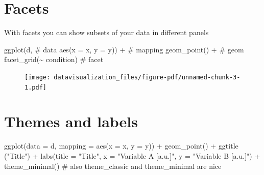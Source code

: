 \documentclass[
  letterpaper,
  DIV=11,
  numbers=noendperiod,
  oneside]{scrreprt}
\newenvironment{Shaded}{\begin{snugshade}}{\end{snugshade}}
\newcommand{\AttributeTok}[1]{\textcolor[rgb]{0.40,0.45,0.13}{#1}}
\newcommand{\CommentTok}[1]{\textcolor[rgb]{0.37,0.37,0.37}{#1}}
\newcommand{\FunctionTok}[1]{\textcolor[rgb]{0.28,0.35,0.67}{#1}}
\newcommand{\NormalTok}[1]{\textcolor[rgb]{0.00,0.23,0.31}{#1}}
\newcommand{\SpecialCharTok}[1]{\textcolor[rgb]{0.37,0.37,0.37}{#1}}
\newcommand{\StringTok}[1]{\textcolor[rgb]{0.13,0.47,0.30}{#1}}
\begin{document}
\hypertarget{facets}{%
\section{Facets}\label{facets}}

With facets you can show subsets of your data in different panels

\begin{Shaded}
\begin{Highlighting}[]
\FunctionTok{ggplot}\NormalTok{(d, }\CommentTok{\# data}
       \FunctionTok{aes}\NormalTok{(}\AttributeTok{x =}\NormalTok{ x, }\AttributeTok{y =}\NormalTok{ y)) }\SpecialCharTok{+} \CommentTok{\# mapping}
    \FunctionTok{geom\_point}\NormalTok{() }\SpecialCharTok{+} \CommentTok{\# geom }
    \FunctionTok{facet\_grid}\NormalTok{(}\SpecialCharTok{\textasciitilde{}}\NormalTok{ condition) }\CommentTok{\# facet}
\end{Highlighting}
\end{Shaded}

\begin{figure}[H]

{\centering \texttt{[image: datavisualization\_files/figure-pdf/unnamed-chunk-3-1.pdf]}

}

\end{figure}

\hypertarget{themes-and-labels}{%
\section{Themes and labels}\label{themes-and-labels}}

\begin{Shaded}
\begin{Highlighting}[]
\FunctionTok{ggplot}\NormalTok{(}\AttributeTok{data =}\NormalTok{ d,}
       \AttributeTok{mapping =} \FunctionTok{aes}\NormalTok{(}\AttributeTok{x =}\NormalTok{ x,}
                     \AttributeTok{y =}\NormalTok{ y)) }\SpecialCharTok{+}
    \FunctionTok{geom\_point}\NormalTok{() }\SpecialCharTok{+}
    \FunctionTok{ggtitle}\NormalTok{ (}\StringTok{"Title"}\NormalTok{) }\SpecialCharTok{+}
    \FunctionTok{labs}\NormalTok{(}\AttributeTok{title =} \StringTok{"Title"}\NormalTok{, }
        \AttributeTok{x =} \StringTok{"Variable A  [a.u.]"}\NormalTok{,}
        \AttributeTok{y =} \StringTok{"Variable B [a.u.]"}\NormalTok{) }\SpecialCharTok{+}
    \FunctionTok{theme\_minimal}\NormalTok{() }\CommentTok{\# also theme\_classic and theme\_minimal are nice}
\end{Highlighting}
\end{Shaded}
\end{document}
